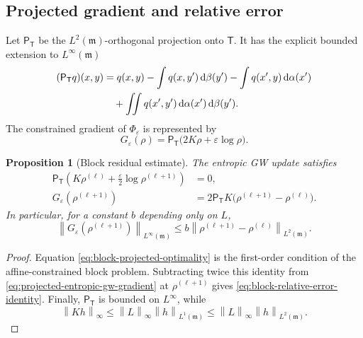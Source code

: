 \documentclass[11pt]{article}
\newtheorem{proposition}[theorem]{Proposition}
\theoremstyle{definition}
\theoremstyle{remark}
\newcommand{\dd}{\,\mathrm d}
\newcommand{\eps}{\varepsilon}
\newcommand{\norm}[1]{\left\lVert #1\right\rVert}
\begin{document}
\subsection{Projected gradient and relative error}

Let \(\mathsf P_{\mathsf T}\) be the \(L^2(\mathfrak m)\)-orthogonal
projection onto \(\mathsf T\).  It has the explicit bounded extension to
\(L^\infty(\mathfrak m)\)
\begin{align}
 (\mathsf P_{\mathsf T}q)(x,y)
 &=
 q(x,y)
 -\int q(x,y')\dd\beta(y')
 -\int q(x',y)\dd\alpha(x')
 \notag\\
 &\quad
 +\iint q(x',y')\dd\alpha(x')\dd\beta(y').
 \label{eq:coupling-tangent-projection}
\end{align}
The constrained gradient of \(\Phi_\eps\) is represented by
\begin{equation}\label{eq:projected-entropic-gw-gradient}
 G_\eps(\rho)
 =
 \mathsf P_{\mathsf T}\bigl(2K\rho+\eps\log\rho\bigr).
\end{equation}

\begin{proposition}[Block residual estimate]
\label{prop:block-residual-estimate}
The entropic GW update satisfies
\begin{align}
 \mathsf P_{\mathsf T}
 \left(K\rho^{(\ell)}
       +\frac\eps2\log\rho^{(\ell+1)}\right)
 &=0,
 \label{eq:block-projected-optimality}\\
 G_\eps(\rho^{(\ell+1)})
 &=
 2\mathsf P_{\mathsf T}K
 \bigl(\rho^{(\ell+1)}-\rho^{(\ell)}\bigr).
 \label{eq:block-relative-error-identity}
\end{align}
In particular, for a constant \(b\) depending only on \(L\),
\begin{equation}\label{eq:block-relative-error-bound}
 \norm{G_\eps(\rho^{(\ell+1)})}_{L^\infty(\mathfrak m)}
 \leq
 b\norm{\rho^{(\ell+1)}-\rho^{(\ell)}}_{L^2(\mathfrak m)}.
\end{equation}
\end{proposition}

\begin{proof}
Equation \eqref{eq:block-projected-optimality} is the first-order condition
of the affine-constrained block problem.  Subtracting twice this identity
from \eqref{eq:projected-entropic-gw-gradient} at
\(\rho^{(\ell+1)}\) gives
\eqref{eq:block-relative-error-identity}.  Finally,
\(\mathsf P_{\mathsf T}\) is bounded on \(L^\infty\), while
\[
 \norm{Kh}_\infty
 \leq\norm{L}_\infty\norm{h}_{L^1(\mathfrak m)}
 \leq\norm{L}_\infty\norm{h}_{L^2(\mathfrak m)}.
\]
\end{proof}
\end{document}
